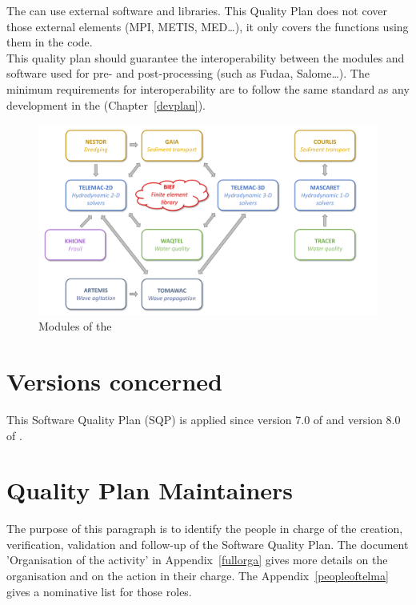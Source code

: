 The \telemacsystem{} can use external software and libraries. This Quality Plan
does not cover those external elements (MPI, METIS, MED\ldots), it only covers
the functions using them in the code.\\

This quality plan should guarantee the interoperability between the
\telemacsystem{} modules and software used for pre- and post-processing (such
as Fudaa, Salome\ldots).  The minimum requirements for interoperability are
to follow the same standard as any development in the \telemacsystem{}
(Chapter~\ref{devplan}).

\begin{figure}[H]
  \centering
  \includegraphics[scale=0.4]{graphics/telemac-modules.png}
\caption{\label{telma_codes} Modules of the \telemacsystem{}}
\end{figure}

\section{Versions concerned}

This Software Quality Plan (SQP) is applied since version 7.0 of \tel{} and
version 8.0 of \mascaret.

\section{Quality Plan Maintainers}

The purpose of this paragraph is to identify the people in charge of the
creation, verification, validation and follow-up of the Software Quality Plan.
The document 'Organisation of the \telemacsystem{} activity' in
Appendix~\ref{fullorga} gives more details on the organisation and on the
action in their charge. The Appendix~\ref{peopleoftelma} gives a nominative
list for those roles.

